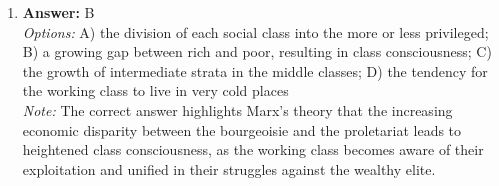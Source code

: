 \documentclass[12pt]{article}
\begin{document}
\begin{enumerate}[label=\arabic*.]
\\ \textit{Note:} The media-themes model of media influence posits that through social interaction, individuals actively engage with and reinforce the ideologies and representations presented in media, thereby solidifying the ideas and images that they have selected for themselves.
\item \textbf{Answer:} B
\\ \textit{Options:} A) the division of each social class into the more or less privileged; B) a growing gap between rich and poor, resulting in class consciousness; C) the growth of intermediate strata in the middle classes; D) the tendency for the working class to live in very cold places
\\ \textit{Note:} The correct answer highlights Marx's theory that the increasing economic disparity between the bourgeoisie and the proletariat leads to heightened class consciousness, as the working class becomes aware of their exploitation and unified in their struggles against the wealthy elite.
\end{enumerate}
\end{document}
